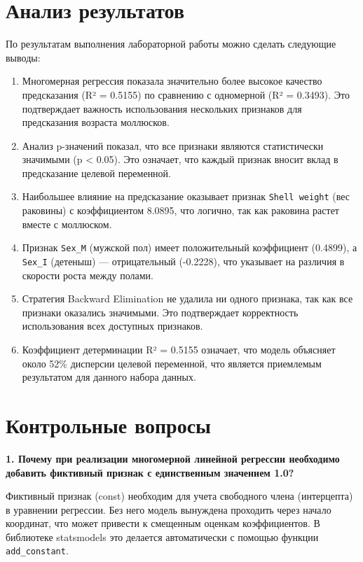 \section{Анализ результатов}

По результатам выполнения лабораторной работы можно сделать следующие выводы:

\begin{enumerate}
    \item Многомерная регрессия показала значительно более высокое качество предсказания (R² = 0.5155) по сравнению с одномерной (R² = 0.3493). Это подтверждает важность использования нескольких признаков для предсказания возраста моллюсков.
    
    \item Анализ p-значений показал, что все признаки являются статистически значимыми (p < 0.05). Это означает, что каждый признак вносит вклад в предсказание целевой переменной.
    
    \item Наибольшее влияние на предсказание оказывает признак \texttt{Shell weight} (вес раковины) с коэффициентом 8.0895, что логично, так как раковина растет вместе с моллюском.
    
    \item Признак \texttt{Sex\_M} (мужской пол) имеет положительный коэффициент (0.4899), а \texttt{Sex\_I} (детеныш) — отрицательный (-0.2228), что указывает на различия в скорости роста между полами.
    
    \item Стратегия Backward Elimination не удалила ни одного признака, так как все признаки оказались значимыми. Это подтверждает корректность использования всех доступных признаков.
    
    \item Коэффициент детерминации R² = 0.5155 означает, что модель объясняет около 52\% дисперсии целевой переменной, что является приемлемым результатом для данного набора данных.
\end{enumerate}

\section{Контрольные вопросы}

\textbf{1. Почему при реализации многомерной линейной регрессии необходимо добавить фиктивный признак с единственным значением 1.0?}

Фиктивный признак (const) необходим для учета свободного члена (интерцепта) в уравнении регрессии. Без него модель вынуждена проходить через начало координат, что может привести к смещенным оценкам коэффициентов. В библиотеке statsmodels это делается автоматически с помощью функции \texttt{add\_constant}.

